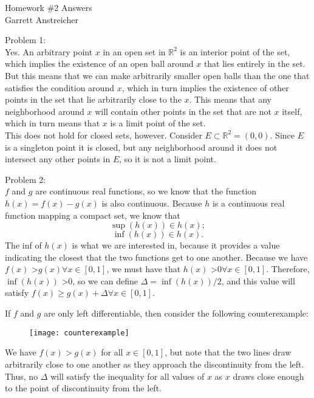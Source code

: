 \documentclass[12pt,leqno]{article}
\begin{document}
\begin{center}
\Large{Homework {\#}2 Answers}\\
\large{Garrett Anstreicher}
\end{center}

\bigskip

\noindent Problem 1:\\
\indent Yes. An arbitrary point $x$ in an open set in $\mathds{R}^2$ is an interior point of the set, which implies the existence of an open ball around $x$ that lies entirely in the set. But this means that we can make arbitrarily smaller open balls than the one that satisfies the condition around $x$, which in turn implies the existence of other points in the set that lie arbitrarily close to the $x$. This means that any neighborhood around $x$ will contain other points in the set that are not $x$ itself, which in turn means that $x$ is a limit point of the set.\\
\indent This does not hold for closed sets, however. Consider $E \subset \mathds{R}^2 = {(0, 0)}.$ Since $E$ is a singleton point it is closed, but any neighborhood around it does not intersect any other points in $E$, so it is not a limit point.

\bigskip
\noindent Problem 2:\\
\indent $f$ and $g$ are continuous real functions, so we know that the function $h(x) = f(x) - g(x)$ is also continuous. Because $h$ is a continuous real function mapping a compact set, we know that 
$$\sup(h(x)) \in h(x);$$
$$\inf(h(x)) \in h(x).$$
The inf of $h(x)$ is what we are interested in, because it provides a value indicating the closest that the two functions get to one another. Because we have $f(x)$ \textgreater $g(x) \forall x \in [0,1]$, we must have that $h(x)$ \textgreater $0 \forall x \in [0, 1]$. Therefore, $\inf(h(x))$ \textgreater 0, so we can define $\Delta = \inf(h(x))/2$, and this value will satisfy $f(x) \geq g(x) + \Delta \forall x \in[0,1].$

\pagebreak
\indent If $f$ and $g$ are only left differentiable, then consider the following counterexample:
\begin{figure}[!h]
\texttt{[image: counterexample]}
\end{figure}
We have $f(x) > g(x)$ for all $x \in [0, 1]$, but note that the two lines draw arbitrarily close to one another as they approach the discontinuity from the left. Thus, no $\Delta$ will satisfy the inequality for all values of $x$ as $x$ draws close enough to the point of discontinuity from the left.
\end{document}
